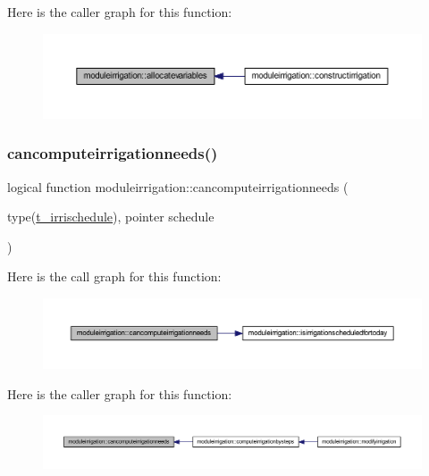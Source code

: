 Here is the caller graph for this function\+:\nopagebreak
\begin{figure}[H]
\begin{center}
\leavevmode
\includegraphics[width=350pt]{namespacemoduleirrigation_af29d54feea0c7cea86e11b179c4a36a3_icgraph}
\end{center}
\end{figure}
\mbox{\label{namespacemoduleirrigation_a4eb93ff5b528eade2a9dc76c368c8076}} 
\subsubsection{\texorpdfstring{cancomputeirrigationneeds()}{cancomputeirrigationneeds()}}
{\footnotesize\ttfamily logical function moduleirrigation\+::cancomputeirrigationneeds (\begin{DoxyParamCaption}\item[{type(\mbox{\hyperlink{structmoduleirrigation_1_1t__irrischedule}{t\+\_\+irrischedule}}), pointer}]{schedule }\end{DoxyParamCaption})\hspace{0.3cm}{\ttfamily [private]}}

Here is the call graph for this function\+:\nopagebreak
\begin{figure}[H]
\begin{center}
\leavevmode
\includegraphics[width=350pt]{namespacemoduleirrigation_a4eb93ff5b528eade2a9dc76c368c8076_cgraph}
\end{center}
\end{figure}
Here is the caller graph for this function\+:\nopagebreak
\begin{figure}[H]
\begin{center}
\leavevmode
\includegraphics[width=350pt]{namespacemoduleirrigation_a4eb93ff5b528eade2a9dc76c368c8076_icgraph}
\end{center}
\end{figure}
\mbox{\label{namespacemoduleirrigation_aa85b5fec6716d256db1e856f29f36468}} 
